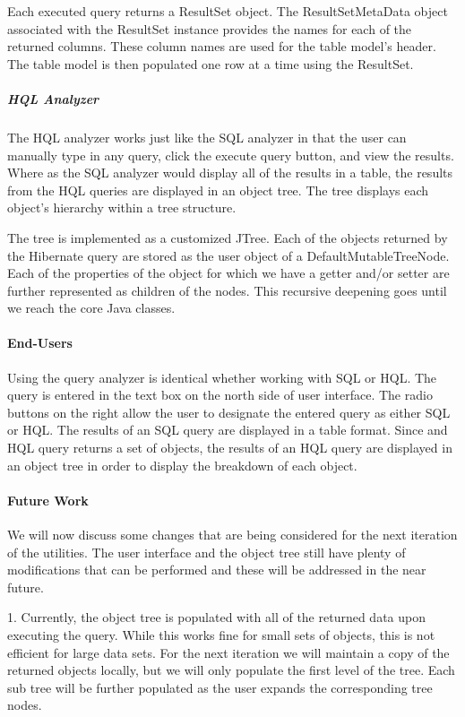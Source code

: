 Each executed query returns a ResultSet object. The ResultSetMetaData object associated with the ResultSet instance provides the names for each of the returned columns. These column names are used for the table model's header. The table model is then populated one row at a time using the ResultSet.

\subparagraph{HQL Analyzer}

The HQL analyzer works just like the SQL analyzer in that the user can manually type in any query, click the execute query button, and view the results. Where as the SQL analyzer would display all of the results in a table, the results from the HQL queries are displayed in an object tree. The tree displays each object's hierarchy within a tree structure.

The tree is implemented as a customized JTree. Each of the objects returned by the Hibernate query are stored as the user object of a DefaultMutableTreeNode. Each of the properties of the object for which we have a getter and/or setter are further represented as children of the nodes. This recursive deepening goes until we reach the core Java classes.

\paragraph{End-Users}
Using the query analyzer is identical whether working with SQL or HQL. The query is entered in the text box on the north side of user interface. The radio buttons on the right allow the user to designate the entered query as either SQL or HQL. The results of an SQL query are displayed in a table format. Since and HQL query returns a set of objects, the results of an HQL query are displayed in an object tree in order to display the breakdown of each object.

\paragraph{Future Work}
We will now discuss some changes that are being considered for the next iteration of the utilities. The user interface and the object tree still have plenty of modifications that can be performed and these will be addressed in the near future.

1. Currently, the object tree is populated with all of the returned data upon executing the query. While this works fine for small sets of objects, this is not efficient for large data sets. For the next iteration we will maintain a copy of the returned objects locally, but we will only populate the first level of the tree. Each sub tree will be further populated as the user expands the corresponding tree nodes.

